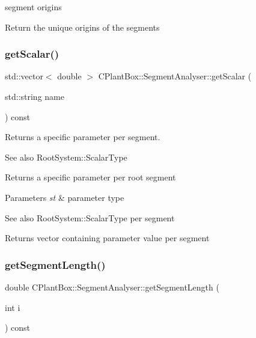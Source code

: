 segment origins 

Return the unique origins of the segments \mbox{\label{classCPlantBox_1_1SegmentAnalyser_a00b162007d72a6ba4adf48972cd0f9bf}} 
\subsubsection{\texorpdfstring{get\+Scalar()}{getScalar()}}
{\footnotesize\ttfamily std\+::vector$<$ double $>$ C\+Plant\+Box\+::\+Segment\+Analyser\+::get\+Scalar (\begin{DoxyParamCaption}\item[{std\+::string}]{name }\end{DoxyParamCaption}) const}



Returns a specific parameter per segment. 

\begin{DoxySeeAlso}{See also}
Root\+System\+::\+Scalar\+Type
\end{DoxySeeAlso}
Returns a specific parameter per root segment


\begin{DoxyParams}{Parameters}
{\em st} & parameter type \\
\hline
\end{DoxyParams}
\begin{DoxySeeAlso}{See also}
Root\+System\+::\+Scalar\+Type per segment 
\end{DoxySeeAlso}
\begin{DoxyReturn}{Returns}
vector containing parameter value per segment 
\end{DoxyReturn}
\mbox{\label{classCPlantBox_1_1SegmentAnalyser_aa223aa2a58d0eb0b910ccfe03877b78e}} 
\subsubsection{\texorpdfstring{get\+Segment\+Length()}{getSegmentLength()}}
{\footnotesize\ttfamily double C\+Plant\+Box\+::\+Segment\+Analyser\+::get\+Segment\+Length (\begin{DoxyParamCaption}\item[{int}]{i }\end{DoxyParamCaption}) const}



